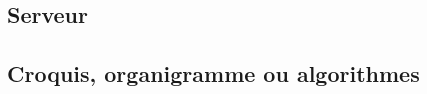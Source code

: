 \documentclass[12pt,french]{article}
\begin{document}











        

        \subsection{Serveur} %
        \label{sub:serveur}
            

        \subsection{Croquis, organigramme ou algorithmes} %
        \label{sub:croquis-org-algo}
        
\end{document}
